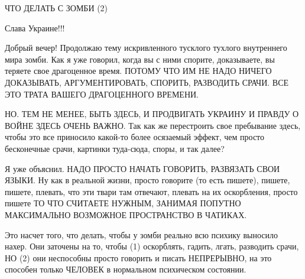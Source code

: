  
 
 
 
 

ЧТО ДЕЛАТЬ С ЗОМБИ (2)

Слава Украине!!! 💛 💙 💛 💙 💛 💙 💛

Добрый вечер! Продолжаю тему искривленного тусклого тухлого внутреннего мира
зомби. Как я уже говорил, когда вы с ними спорите, доказываете, вы теряете свое
драгоценное время. ПОТОМУ ЧТО ИМ НЕ НАДО НИЧЕГО ДОКАЗЫВАТЬ, АРГУМЕНТИРОВАТЬ,
СПОРИТЬ, РАЗВОДИТЬ СРАЧИ.  ВСЕ ЭТО ТРАТА ВАШЕГО ДРАГОЦЕННОГО ВРЕМЕНИ.

НО. ТЕМ НЕ МЕНЕЕ, БЫТЬ ЗДЕСЬ, И ПРОДВИГАТЬ УКРАИНУ И ПРАВДУ О ВОЙНЕ ЗДЕСЬ ОЧЕНЬ
ВАЖНО. Так как же перестроить свое пребывание здесь, чтобы это все приносило
какой-то более осязаемый эффект, чем просто бесконечные срачи, картинки
туда-сюда, споры, и так далее?

Я уже объяснил. НАДО ПРОСТО НАЧАТЬ ГОВОРИТЬ, РАЗВЯЗАТЬ СВОИ ЯЗЫКИ. Ну как в
реальной жизни, просто говорите (то есть пишете), пишете, пишете, плевать, что
эти твари там отвечают, плевать на их оскорбления, просто пишете ТО ЧТО
СЧИТАЕТЕ НУЖНЫМ, ЗАНИМАЯ ПОПУТНО МАКСИМАЛЬНО ВОЗМОЖНОЕ ПРОСТРАНСТВО В ЧАТИКАХ.

Это насчет того, что делать, чтобы у зомби реально всю психику выносило нахер.
Они заточены на то, чтобы (1) оскорблять, гадить, лгать, разводить срачи, НО
(2) они неспособны просто говорить и писать НЕПРЕРЫВНО, на это способен только
ЧЕЛОВЕК в нормальном психическом состоянии. 
